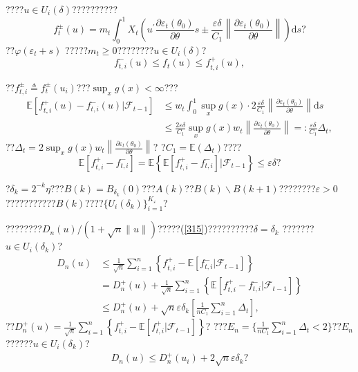 \documentclass[a4paper,12pt,openany,oneside,utf-8]{ctexbook}
\begin{document}
	????$u\in U_i(\delta)$??????????$$f_t^{\pm}(u)=m_t\int_0^1X_t\left(u^{\prime}\frac{\partial\varepsilon_t(\theta_0)}{\partial\theta}s\pm\frac{\varepsilon\delta}{C_1}\left\|\frac{\partial\varepsilon_t(\theta_0)}{\partial\theta}\right\|\right)\mathrm{d}s\mbox{?}$$
	??$\varphi(\varepsilon_t+s)$ ?????$m_t\ge0$????????$u\in U_i(\delta)$?$$f_{t,i}^{-}(u)\le f_t(u) \le f_{t,i}^{+}(u),$$
	
	\noindent ??$f_{t,i}^{\pm}\triangleq f_t^{\pm}(u_i)$???$\sup_xg(x)<\infty$???
	\begin{align}\label{315}
		\mathbb{E}\left[f_{t,i}^{+}(u)-f_{t,i}^{-}(u)|\mathcal{F}_{t-1}\right]&\le w_t\int_0^1\sup_xg(x)\cdot2\frac{\varepsilon\delta}{C_1}\left\|\frac{\partial\varepsilon_t(\theta_0)}{\partial\theta}\right\|\mathrm{d}s\nonumber\\
		&\le\frac{2\varepsilon\delta}{C_1}\sup_xg(x)w_t\left\|\frac{\partial\varepsilon_t(\theta_0)}{\partial\theta}\right\|=:\frac{\varepsilon\delta}{C_1}\Delta_t,
	\end{align}
	??$\Delta_t=2\sup_xg(x)w_t\left\|\frac{\partial\varepsilon_t(\theta_0)}{\partial\theta}\right\|$? ?$C_1=\mathbb{E}(\Delta_t)$????
	$$\mathbb{E}\left[f_{t,i}^{+}-f_{t,i}^{-}\right]=\mathbb{E}\left\{\mathbb{E}\left[f_{t,i}^{+}-f_{t,i}^{-}\right]\Big|\mathcal{F}_{t-1}\right\}\le \varepsilon\delta\mbox{?}$$
	
	?$\delta_k=2^{-k}\eta$???$B(k)=B_{\delta_k}(0)$???$A(k)$??$B(k) \backslash B(k+1)$????????$\varepsilon>0$???????????$B(k)$????$\{U_i(\delta_k)\}_{i=1}^{K_\varepsilon}$?
	
	????????$D_n(u)/(1+\sqrt{n}\|u\|)$?????(\ref{315})??????????$\delta=\delta_k$ ???????$u\in U_i(\delta_k)$?
	\begin{align}
		D_n(u)&\le\frac{1}{\sqrt{n}}\sum_{i=1}^n\left\{f_{t,i}^{+}-\mathbb{E}\left[f_{t,i}^{-}\Big|\mathcal{F}_{t-1}\right]\right\}\nonumber\\
		&=D_n^{+}(u)+\frac{1}{\sqrt{n}}\sum_{i=1}^n\left\{\mathbb{E}\left[f_{t,i}^{+}-f_{t,i}^{-}\Big|\mathcal{F}_{t-1}\right]\right\}\nonumber\\
		&\le D_n^{+}(u)+\sqrt{n}\varepsilon\delta_k\left[\frac{1}{nC_1}\sum_{i=1}^n\Delta_t\right],\nonumber
	\end{align}
	??$D_n^{+}(u)=\frac{1}{\sqrt{n}}\sum_{i=1}^n\left\{f_{t,i}^{+}-\mathbb{E}\left[f_{t,i}^{+}\Big|\mathcal{F}_{t-1}\right]\right\}$? ???$E_n=\{\frac{1}{nC_1}\sum_{i=1}^n\Delta_t<2\}$??$E_n$??????$u\in U_i(\delta_k)$?
	\begin{align}\label{316}
		D_n(u)\le D_n^{+}(u_i)+2\sqrt{n}\varepsilon\delta_k\mbox{?}
	\end{align}
	
\end{document}
